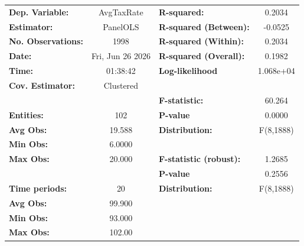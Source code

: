 \begin{center}
\begin{tabular}{lclc}
\toprule
\textbf{Dep. Variable:}                       &     AvgTaxRate     & \textbf{  R-squared:         }   &      0.2034      \\
\textbf{Estimator:}                           &      PanelOLS      & \textbf{  R-squared (Between):}  &     -0.0525      \\
\textbf{No. Observations:}                    &        1998        & \textbf{  R-squared (Within):}   &      0.2034      \\
\textbf{Date:}                                &  Fri, Jun 26 2026  & \textbf{  R-squared (Overall):}  &      0.1982      \\
\textbf{Time:}                                &      01:38:42      & \textbf{  Log-likelihood     }   &    1.068e+04     \\
\textbf{Cov. Estimator:}                      &     Clustered      & \textbf{                     }   &                  \\
\textbf{}                                     &                    & \textbf{  F-statistic:       }   &      60.264      \\
\textbf{Entities:}                            &        102         & \textbf{  P-value            }   &      0.0000      \\
\textbf{Avg Obs:}                             &       19.588       & \textbf{  Distribution:      }   &    F(8,1888)     \\
\textbf{Min Obs:}                             &       6.0000       & \textbf{                     }   &                  \\
\textbf{Max Obs:}                             &       20.000       & \textbf{  F-statistic (robust):} &      1.2685      \\
\textbf{}                                     &                    & \textbf{  P-value            }   &      0.2556      \\
\textbf{Time periods:}                        &         20         & \textbf{  Distribution:      }   &    F(8,1888)     \\
\textbf{Avg Obs:}                             &       99.900       & \textbf{                     }   &                  \\
\textbf{Min Obs:}                             &       93.000       & \textbf{                     }   &                  \\
\textbf{Max Obs:}                             &       102.00       & \textbf{                     }   &                  \\

\end{tabular}
\end{center}
